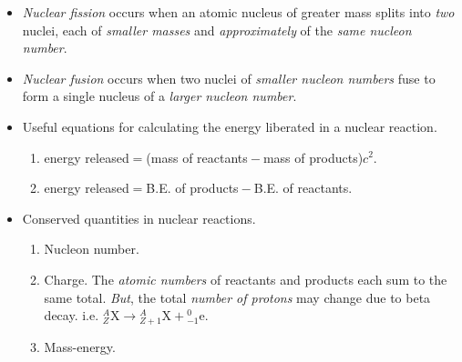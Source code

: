 \documentclass[oneside]{book}
\begin{document}
\begin{minipage}{0.5\textwidth}
    \begin{itemize}
        \item[\AsteriskThin] \emph{Nuclear fission} occurs when an atomic nucleus of greater mass splits into \emph{two} nuclei, each of \emph{smaller masses} and \emph{approximately} of the \emph{same nucleon number}.
        \item[\AsteriskThin] \emph{Nuclear fusion} occurs when two nuclei of \emph{smaller nucleon numbers} fuse to form a single nucleus of a \emph{larger nucleon number}.
        \item Useful equations for calculating the energy liberated in a nuclear reaction. 
        \begin{enumerate}
            \item energy released\({}={}\)(mass of reactants\({}-{}\)mass of products)\({}c^2\).
            \item energy released\({}={}\)B.E. of products\({}-{}\)B.E. of reactants.
        \end{enumerate}
        \item Conserved quantities in nuclear reactions.
        \begin{enumerate}
            \item Nucleon number.
            \item Charge. The \emph{atomic numbers} of reactants and products each sum to the same total. \emph{But}, the total \emph{number of protons} may change due to beta decay. i.e. 
            \(_Z^A\text{X}\to{}_{Z+1}^A\text{X}+{}_{-1}^0\text{e}\).
            \item Mass-energy.
        \end{enumerate}
    \end{itemize}
\end{minipage}
\end{document}
